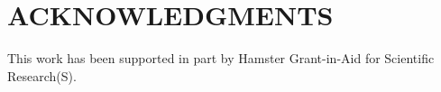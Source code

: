 \documentclass[letterpaper, 10 pt, conference]{IEEEtran}  %
\begin{document}
\addtolength{\textheight}{-12cm}   %


\section*{ACKNOWLEDGMENTS}
This work has been supported in part by Hamster Grant-in-Aid for Scientific Research(S).



%

\end{document}
